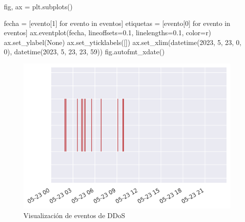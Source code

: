 \documentclass[
  letterpaper,
  DIV=11,
  numbers=noendperiod]{scrartcl}
\newenvironment{Shaded}{\begin{snugshade}}{\end{snugshade}}
\newcommand{\ControlFlowTok}[1]{\textcolor[rgb]{0.00,0.23,0.31}{#1}}
\newcommand{\DecValTok}[1]{\textcolor[rgb]{0.68,0.00,0.00}{#1}}
\newcommand{\FloatTok}[1]{\textcolor[rgb]{0.68,0.00,0.00}{#1}}
\newcommand{\KeywordTok}[1]{\textcolor[rgb]{0.00,0.23,0.31}{#1}}
\newcommand{\NormalTok}[1]{\textcolor[rgb]{0.00,0.23,0.31}{#1}}
\newcommand{\OperatorTok}[1]{\textcolor[rgb]{0.37,0.37,0.37}{#1}}
\newcommand{\StringTok}[1]{\textcolor[rgb]{0.13,0.47,0.30}{#1}}
\newcommand{\VariableTok}[1]{\textcolor[rgb]{0.07,0.07,0.07}{#1}}
\begin{document}
\begin{Shaded}
\begin{Highlighting}[]
\NormalTok{fig, ax }\OperatorTok{=}\NormalTok{ plt.subplots()}

\NormalTok{fecha }\OperatorTok{=}\NormalTok{ [evento[}\DecValTok{1}\NormalTok{] }\ControlFlowTok{for}\NormalTok{ evento }\KeywordTok{in}\NormalTok{ eventos]}
\NormalTok{etiquetas }\OperatorTok{=}\NormalTok{ [evento[}\DecValTok{0}\NormalTok{] }\ControlFlowTok{for}\NormalTok{ evento }\KeywordTok{in}\NormalTok{ eventos]}
\NormalTok{ax.eventplot(fecha, lineoffsets}\OperatorTok{=}\FloatTok{0.1}\NormalTok{, linelengths}\OperatorTok{=}\FloatTok{0.1}\NormalTok{, color}\OperatorTok{=}\StringTok{\textquotesingle{}r\textquotesingle{}}\NormalTok{)}
\NormalTok{ax.set\_ylabel(}\VariableTok{None}\NormalTok{)}
\NormalTok{ax.set\_yticklabels([])}
\NormalTok{ax.set\_xlim(datetime(}\DecValTok{2023}\NormalTok{, }\DecValTok{5}\NormalTok{, }\DecValTok{23}\NormalTok{, }\DecValTok{0}\NormalTok{, }\DecValTok{0}\NormalTok{), datetime(}\DecValTok{2023}\NormalTok{, }\DecValTok{5}\NormalTok{, }\DecValTok{23}\NormalTok{, }\DecValTok{23}\NormalTok{, }\DecValTok{59}\NormalTok{))}
\NormalTok{fig.autofmt\_xdate()}
\end{Highlighting}
\end{Shaded}

\begin{figure}[H]

{\centering \includegraphics{Análisis_files/figure-pdf/fig-eventosddos-output-1.png}

}

\caption{\label{fig-eventosddos}Visualización de eventos de DDoS}

\end{figure}
\end{document}
